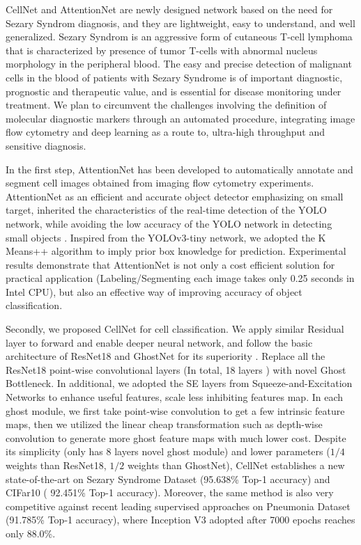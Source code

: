 CellNet and AttentionNet are newly designed network based on the need for Sezary Syndrom diagnosis, and they are lightweight, easy to understand, and well generalized. Sezary Syndrom is an aggressive form of cutaneous T-cell lymphoma that is characterized by presence of tumor T-cells with abnormal nucleus morphology in the peripheral blood. The easy and precise detection of malignant cells in the blood of patients with Sezary Syndrome is of important diagnostic, prognostic and therapeutic value, and is essential for disease monitoring under treatment\cite{b6}\cite{b7}. We plan to circumvent the challenges involving the definition of molecular diagnostic markers through an automated procedure, integrating image flow cytometry and deep learning as a route to, ultra-high throughput and sensitive diagnosis.

In the first step, AttentionNet has been developed to automatically annotate and segment cell images obtained from imaging flow cytometry experiments. AttentionNet as an efficient and accurate object detector emphasizing on small target, inherited the characteristics of the real-time detection of the YOLO network, while avoiding the low accuracy of the YOLO network in detecting small objects \cite{b33}. Inspired from the YOLOv3-tiny network\cite{b18}, we adopted the K Means++ algorithm to imply prior box knowledge for prediction. Experimental results demonstrate that AttentionNet is not only a cost efficient solution for practical application (Labeling/Segmenting each image takes only 0.25 seconds in Intel CPU), but also an effective way of improving accuracy of object classification. 

Secondly, we proposed CellNet for cell classification. We apply similar Residual layer to forward and enable deeper neural network, and follow the basic architecture of ResNet18 and GhostNet for its superiority \cite{b19}\cite{b20}. Replace all the ResNet18 \cite{b20} point-wise convolutional layers (In total, 18 layers ) with novel Ghost Bottleneck. In additional, we adopted the SE layers from Squeeze-and-Excitation Networks \cite{b24} to enhance useful features, scale less inhibiting features map. In each ghost module, we first take point-wise convolution to get a few intrinsic feature maps, then we utilized the linear cheap transformation such as depth-wise convolution to generate more ghost feature maps with much lower cost.
Despite its simplicity (only has 8 layers novel ghost module) and lower parameters ($1/4$ weights than ResNet18\cite{b20}, $1/2$ weights than GhostNet\cite{b19}), CellNet establishes a new state-of-the-art on Sezary Syndrome Dataset (95.638\% Top-1 accuracy) and CIFar10\cite{b21} ( 92.451\% Top-1 accuracy). Moreover, the same method is also very competitive against recent leading supervised approaches on Pneumonia Dataset (91.785\% Top-1 accuracy), where Inception V3 adopted after 7000 epochs reaches only 88.0\%\cite{b38}. 

